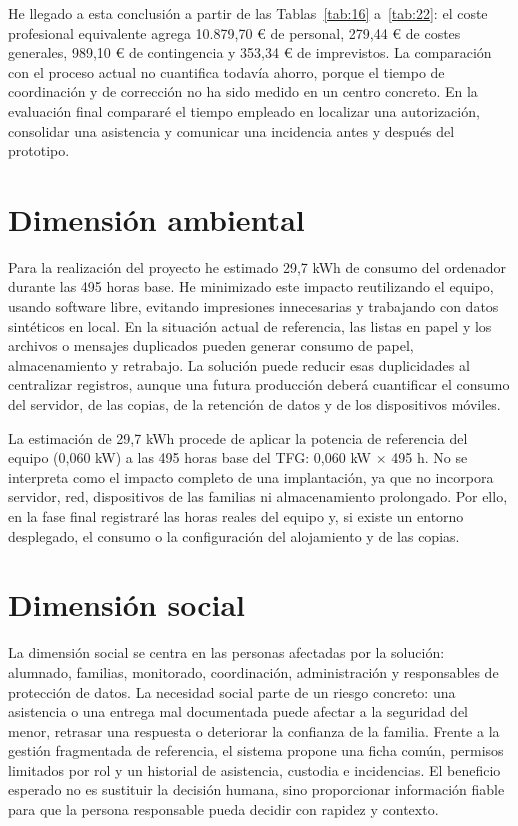 He llegado a esta conclusión a partir de las Tablas~\ref{tab:16} a~\ref{tab:22}: el coste profesional equivalente agrega 10.879,70 € de personal, 279,44 € de costes generales, 989,10 € de contingencia y 353,34 € de imprevistos. La comparación con el proceso actual no cuantifica todavía ahorro, porque el tiempo de coordinación y de corrección no ha sido medido en un centro concreto. En la evaluación final compararé el tiempo empleado en localizar una autorización, consolidar una asistencia y comunicar una incidencia antes y después del prototipo.

\section{Dimensión ambiental}\label{sec:sost-4}

Para la realización del proyecto he estimado 29,7 kWh de consumo del ordenador durante las 495 horas base. He minimizado este impacto reutilizando el equipo, usando software libre, evitando impresiones innecesarias y trabajando con datos sintéticos en local. En la situación actual de referencia, las listas en papel y los archivos o mensajes duplicados pueden generar consumo de papel, almacenamiento y retrabajo. La solución puede reducir esas duplicidades al centralizar registros, aunque una futura producción deberá cuantificar el consumo del servidor, de las copias, de la retención de datos y de los dispositivos móviles.

La estimación de 29,7 kWh procede de aplicar la potencia de referencia del equipo (0,060 kW) a las 495 horas base del TFG: 0,060 kW $\times$ 495 h. No se interpreta como el impacto completo de una implantación, ya que no incorpora servidor, red, dispositivos de las familias ni almacenamiento prolongado. Por ello, en la fase final registraré las horas reales del equipo y, si existe un entorno desplegado, el consumo o la configuración del alojamiento y de las copias.

\section{Dimensión social}\label{sec:sost-5}

La dimensión social se centra en las personas afectadas por la solución: alumnado, familias, monitorado, coordinación, administración y responsables de protección de datos. La necesidad social parte de un riesgo concreto: una asistencia o una entrega mal documentada puede afectar a la seguridad del menor, retrasar una respuesta o deteriorar la confianza de la familia. Frente a la gestión fragmentada de referencia, el sistema propone una ficha común, permisos limitados por rol y un historial de asistencia, custodia e incidencias. El beneficio esperado no es sustituir la decisión humana, sino proporcionar información fiable para que la persona responsable pueda decidir con rapidez y contexto.

